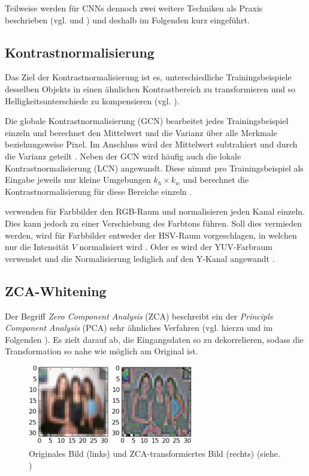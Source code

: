 Teilweise werden für CNNs dennoch zwei weitere Techniken als Praxis beschrieben (vgl. \cite{Andrade2014} und \cite{Goodfellow_maxout_2013}) und deshalb im Folgenden kurz eingeführt.

\subsection{Kontrastnormalisierung}
Das Ziel der Kontrastnormalisierung ist es, unterschiedliche Trainingsbeispiele desselben Objekts in einen ähnlichen Kontrastbereich zu transformieren und so Helligkeitsunterschiede zu kompensieren (vgl. \cite{Zeiler2013b}). 

Die globale Kontrastnormalisierung (GCN) bearbeitet jedes Trainingsbeispiel einzeln und berechnet den Mittelwert und die Varianz über alle Merkmale beziehungsweise Pixel. Im Anschluss wird der Mittelwert subtrahiert und durch die Varianz geteilt \cite[vgl.][]{Sermanet2012}. 
Neben der GCN wird häufig auch die lokale Kontrastnormalisierung (LCN) angewandt. Diese nimmt pro Trainingsbeispiel als Eingabe jeweils nur kleine Umgebungen $k_h \times k_w$ und berechnet die Kontrastnormalisierung für diese Bereiche einzeln \cite[vgl.][]{Jarrett2009}.

\cite{Zeiler2013b} verwenden für Farbbilder den RGB-Raum und normalisieren jeden Kanal einzeln. Dies kann jedoch zu einer Verschiebung des Farbtons führen. Soll dies vermieden werden, wird für Farbbilder entweder der HSV-Raum vorgeschlagen, in welchen nur die Intensität $V$ normalisiert wird \cite[vgl.][S. 56]{Pink2011}. Oder es wird der YUV-Farbraum verwendet und die Normalisierung lediglich auf den Y-Kanal angewandt \cite[vgl.][]{Sermanet2012}.


\subsection{ZCA-Whitening}
Der Begriff \textit{Zero Component Analysis} (ZCA) beschreibt ein der \textit{Principle Component Analysis} (PCA) sehr ähnliches Verfahren (vgl. hierzu und im Folgenden \cite{Krizhevsky2009}). Es zielt darauf ab, die Eingangsdaten so zu dekorrelieren, sodass die Transformation so nahe wie möglich am Original ist. 

\begin{figure}
\centering
\includegraphics[width=0.5\linewidth]{images/4_ZCA}
\caption[]{Originales Bild (links) und ZCA-transformiertes Bild (rechts) (siehe. \cite{Krizhevsky2009})}
\label{fig:4_ZCA}
\end{figure}

